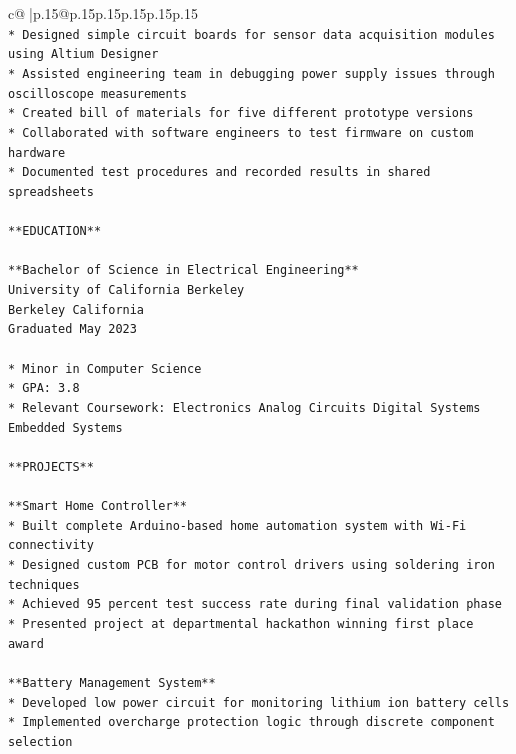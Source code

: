 \documentclass{article}
\begin{document}
{\begin{supertabular}{c@{$\;$}|p{.15\linewidth}@{}p{.15\linewidth}p{.15\linewidth}p{.15\linewidth}p{.15\linewidth}p{.15\linewidth}}
{{{\\ 
\texttt{*   Designed simple circuit boards for sensor data acquisition modules using Altium Designer} \\
\texttt{*   Assisted engineering team in debugging power supply issues through oscilloscope measurements} \\
\texttt{*   Created bill of materials for five different prototype versions} \\
\texttt{*   Collaborated with software engineers to test firmware on custom hardware} \\
\texttt{*   Documented test procedures and recorded results in shared spreadsheets} \\
\\ 
\texttt{**EDUCATION**} \\
\\ 
\texttt{**Bachelor of Science in Electrical Engineering**} \\
\texttt{University of California Berkeley} \\
\texttt{Berkeley California} \\
\texttt{Graduated May 2023} \\
\\ 
\texttt{*   Minor in Computer Science} \\
\texttt{*   GPA: 3.8} \\
\texttt{*   Relevant Coursework: Electronics Analog Circuits Digital Systems Embedded Systems} \\
\\ 
\texttt{**PROJECTS**} \\
\\ 
\texttt{**Smart Home Controller**} \\
\texttt{*   Built complete Arduino{-}based home automation system with Wi{-}Fi connectivity} \\
\texttt{*   Designed custom PCB for motor control drivers using soldering iron techniques} \\
\texttt{*   Achieved 95 percent test success rate during final validation phase} \\
\texttt{*   Presented project at departmental hackathon winning first place award} \\
\\ 
\texttt{**Battery Management System**} \\
\texttt{*   Developed low power circuit for monitoring lithium ion battery cells} \\
\texttt{*   Implemented overcharge protection logic through discrete component selection} \\
}}}
\end{supertabular}}
\end{document}
